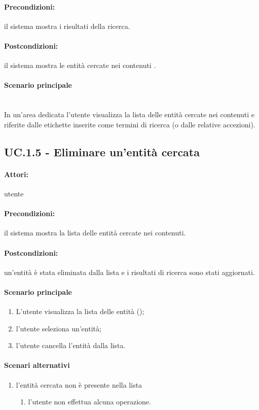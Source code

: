 \documentclass[10pt,a4paper,headinclude,footinclude,hidelinks]{scrreprt} %
\begin{document}
	\paragraph{Precondizioni:} il sistema mostra i risultati della ricerca.
	\paragraph{Postcondizioni:} il sistema mostra le entità cercate nei contenuti .
	\paragraph{Scenario principale} \hfill \\
	In un'area dedicata l'utente visualizza la lista delle entità cercate nei contenuti e riferite dalle etichette inserite come termini di ricerca (o dalle relative accezioni).

	\subsection[UC.1.5]{UC.1.5 - Eliminare un'entità cercata}
	\label{ch:stage:ar:uc:1_5}
	\paragraph{Attori:} utente
	\paragraph{Precondizioni:} il sistema mostra la lista delle entità cercate nei contenuti.
	\paragraph{Postcondizioni:} un'entità è stata eliminata dalla lista e i risultati di ricerca sono stati aggiornati.
	\paragraph{Scenario principale}
	\begin{enumerate}
	\item L'utente visualizza la lista delle entità ();
	\item l'utente seleziona un'entità;
	\item l'utente cancella l'entità dalla lista.
	\end{enumerate}
	\paragraph{Scenari alternativi}
	\begin{enumerate}
	\item l'entità cercata non è presente nella lista
		\begin{enumerate}
		\item l'utente non effettua alcuna operazione.
		\end{enumerate}
	\end{enumerate}
\end{document}
